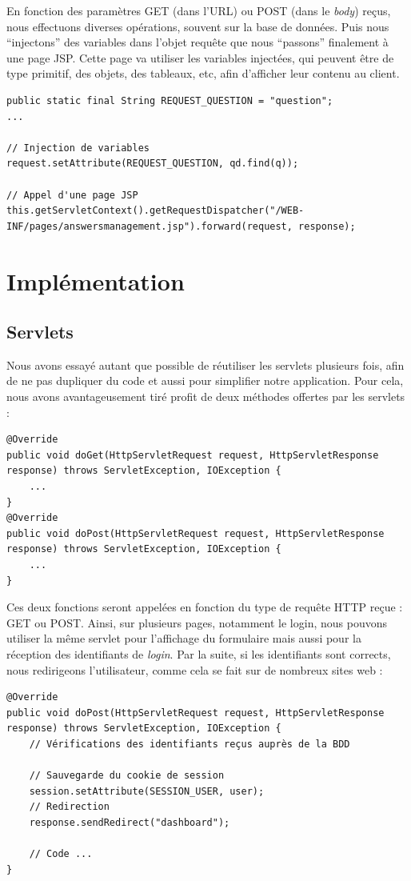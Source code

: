 En fonction des paramètres GET (dans l'URL) ou POST (dans le \textit{body}) reçus, nous effectuons diverses opérations, souvent sur la base de données. Puis nous ``injectons'' des variables dans l'objet requête que nous ``passons'' finalement à une page JSP. Cette page va utiliser les variables injectées, qui peuvent être de type primitif, des objets, des tableaux, etc, afin d'afficher leur contenu au client.

\java
\begin{lstlisting}
public static final String REQUEST_QUESTION = "question";
...

// Injection de variables
request.setAttribute(REQUEST_QUESTION, qd.find(q));

// Appel d'une page JSP
this.getServletContext().getRequestDispatcher("/WEB-INF/pages/answersmanagement.jsp").forward(request, response);
\end{lstlisting}

\section{Implémentation}

\subsection{Servlets}

Nous avons essayé autant que possible de réutiliser les servlets plusieurs fois, afin de ne pas dupliquer du code et aussi pour simplifier notre application. Pour cela, nous avons avantageusement tiré profit de deux méthodes offertes par les servlets :

\begin{lstlisting}
@Override
public void doGet(HttpServletRequest request, HttpServletResponse response) throws ServletException, IOException {
    ...
}
@Override
public void doPost(HttpServletRequest request, HttpServletResponse response) throws ServletException, IOException {
    ...
}
\end{lstlisting}

Ces deux fonctions seront appelées en fonction du type de requête HTTP reçue : GET ou POST. Ainsi, sur plusieurs pages, notamment le login, nous pouvons utiliser la même servlet pour l'affichage du formulaire mais aussi pour la réception des identifiants de \textit{login}. Par la suite, si les identifiants sont corrects, nous redirigeons l'utilisateur, comme cela se fait sur de nombreux sites web :

\begin{lstlisting}
@Override
public void doPost(HttpServletRequest request, HttpServletResponse response) throws ServletException, IOException {
    // Vérifications des identifiants reçus auprès de la BDD

    // Sauvegarde du cookie de session
    session.setAttribute(SESSION_USER, user);
    // Redirection
    response.sendRedirect("dashboard");

    // Code ...
}
\end{lstlisting}

